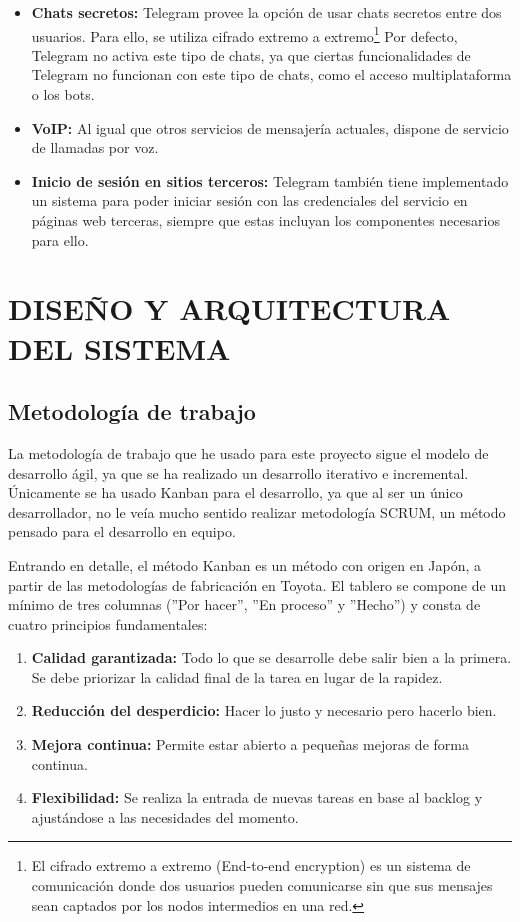 \documentclass[spanish,12pt, a4paper, twoside]{paper}
\let\oldsection\section
\def\section{\cleardoublepage\oldsection}
\begin{document}
\begin{itemize}
\item \textbf{Chats secretos:} Telegram provee la opción de usar chats secretos entre dos usuarios. Para ello, se utiliza cifrado extremo a extremo\footnote{El cifrado extremo a extremo (End-to-end encryption) es un sistema de comunicación donde dos usuarios pueden comunicarse sin que sus mensajes sean captados por los nodos intermedios en una red.} Por defecto, Telegram no activa este tipo de chats, ya que ciertas funcionalidades de Telegram no funcionan con este tipo de chats, como el acceso multiplataforma o los bots.

\item \textbf{VoIP:} Al igual que otros servicios de mensajería actuales, dispone de servicio de llamadas por voz. 

\item \textbf{Inicio de sesión en sitios terceros:} Telegram también tiene implementado un sistema para poder iniciar sesión con las credenciales del servicio en páginas web terceras, siempre que estas incluyan los componentes necesarios para ello. 

\end{itemize}

\section{DISEÑO Y ARQUITECTURA DEL SISTEMA}

\subsection{Metodología de trabajo}

La metodología de trabajo que he usado para este proyecto sigue el modelo de desarrollo ágil, ya que se ha realizado un desarrollo iterativo e incremental. Únicamente se ha usado Kanban para el desarrollo, ya que al ser un único desarrollador, no le veía mucho sentido realizar metodología SCRUM, un método pensado para el desarrollo en equipo.
\newline

Entrando en detalle, el método Kanban es un método con origen en Japón, a partir de las metodologías de fabricación en Toyota. El tablero se compone de un mínimo de tres columnas (''Por hacer'', ''En proceso'' y ''Hecho'') y consta de cuatro principios fundamentales:

\begin{enumerate}
\item\textbf{Calidad garantizada:} Todo lo que se desarrolle debe salir bien a la primera. Se debe priorizar la calidad final de la tarea en lugar de la rapidez.
\item\textbf{Reducción del desperdicio:} Hacer lo justo y necesario pero hacerlo bien.
\item\textbf{Mejora continua:} Permite estar abierto a pequeñas mejoras de forma continua.
\item\textbf{Flexibilidad:} Se realiza la entrada de nuevas tareas en base al backlog y ajustándose a las necesidades del momento.
\end{enumerate} 
\end{document}
